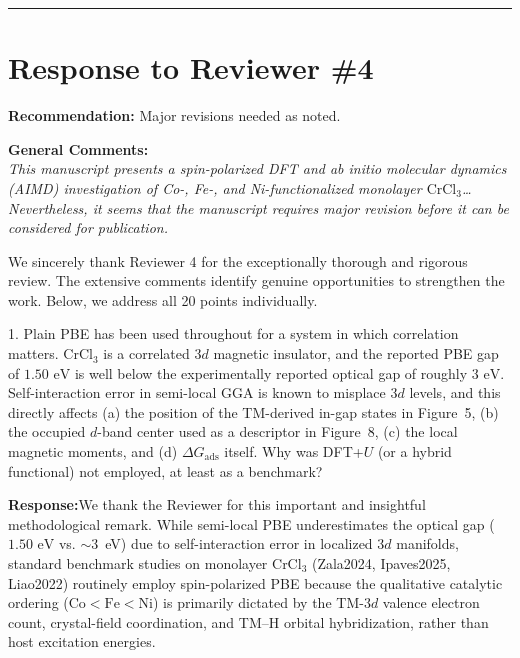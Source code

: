 \documentclass[11pt, sans, a4paper]{moderncv}
\newcommand{\response}{\vspace{0.4em}\noindent\textbf{\color{actionblue}Response:}\hspace{0.5em}}
\begin{document}
\vspace{1.5em}
\noindent\rule{\textwidth}{0.6pt}

\newpage

\section{Response to Reviewer \#4}

\noindent\textbf{Recommendation:} Major revisions needed as noted.

\vspace{0.5em}
\noindent\textbf{General Comments:}\\
\textit{This manuscript presents a spin-polarized DFT and ab initio molecular dynamics (AIMD) investigation of Co-, Fe-, and Ni-functionalized monolayer $\text{CrCl}_3$\ldots Nevertheless, it seems that the manuscript requires major revision before it can be considered for publication.}

\vspace{0.5em}
\noindent We sincerely thank Reviewer 4 for the exceptionally thorough and rigorous review. The extensive comments identify genuine opportunities to strengthen the work. Below, we address all 20 points individually.

\vspace{1em}

\begin{reviewercomment}
1. Plain PBE has been used throughout for a system in which correlation matters. $\text{CrCl}_3$ is a correlated $3d$ magnetic insulator, and the reported PBE gap of $1.50\text{ eV}$ is well below the experimentally reported optical gap of roughly $3\text{ eV}$. Self-interaction error in semi-local GGA is known to misplace $3d$ levels, and this directly affects (a) the position of the TM-derived in-gap states in Figure~5, (b) the occupied $d$-band center used as a descriptor in Figure~8, (c) the local magnetic moments, and (d) $\Delta G_{\mathrm{ads}}$ itself. Why was DFT+$U$ (or a hybrid functional) not employed, at least as a benchmark?
\end{reviewercomment}

\response We thank the Reviewer for this important and insightful methodological remark. While semi-local PBE underestimates the optical gap ($1.50\text{ eV}$ vs. $\sim$3~eV) due to self-interaction error in localized $3d$ manifolds, standard benchmark studies on monolayer CrCl$_3$ (Zala2024, Ipaves2025, Liao2022) routinely employ spin-polarized PBE because the qualitative catalytic ordering ($\text{Co} < \text{Fe} < \text{Ni}$) is primarily dictated by the TM-$3d$ valence electron count, crystal-field coordination, and TM--H orbital hybridization, rather than host excitation energies.
\end{document}
